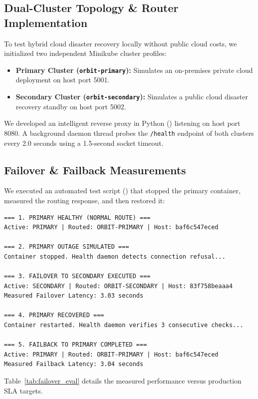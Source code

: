 \documentclass[conference]{IEEEtran}
\begin{document}
\subsection{Dual-Cluster Topology \& Router Implementation}
To test hybrid cloud disaster recovery locally without public cloud costs, we initialized two independent Minikube cluster profiles:
\begin{itemize}
    \item \textbf{Primary Cluster (\texttt{orbit-primary}):} Simulates an on-premises private cloud deployment on host port 5001.
    \item \textbf{Secondary Cluster (\texttt{orbit-secondary}):} Simulates a public cloud disaster recovery standby on host port 5002.
\end{itemize}

We developed an intelligent reverse proxy in Python () listening on host port 8080. A background daemon thread probes the \texttt{/health} endpoint of both clusters every 2.0 seconds using a 1.5-second socket timeout.

\subsection{Failover \& Failback Measurements}
We executed an automated test script () that stopped the primary container, measured the routing response, and then restored it:

\begin{lstlisting}[style=ieeecode]
=== 1. PRIMARY HEALTHY (NORMAL ROUTE) ===
Active: PRIMARY | Routed: ORBIT-PRIMARY | Host: baf6c547eced

=== 2. PRIMARY OUTAGE SIMULATED ===
Container stopped. Health daemon detects connection refusal...

=== 3. FAILOVER TO SECONDARY EXECUTED ===
Active: SECONDARY | Routed: ORBIT-SECONDARY | Host: 83f758beaaa4
Measured Failover Latency: 3.03 seconds

=== 4. PRIMARY RECOVERED ===
Container restarted. Health daemon verifies 3 consecutive checks...

=== 5. FAILBACK TO PRIMARY COMPLETED ===
Active: PRIMARY | Routed: ORBIT-PRIMARY | Host: baf6c547eced
Measured Failback Latency: 3.04 seconds
\end{lstlisting}

Table~\ref{tab:failover_eval} details the measured performance versus production SLA targets.
\end{document}
